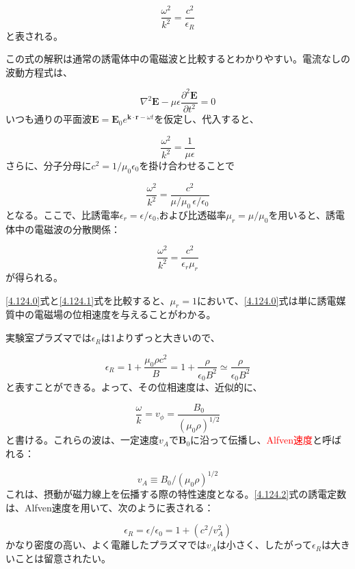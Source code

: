 \documentclass{ltjsarticle}
\numberwithin{equation}{section} %
\begin{document}
\begin{equation} \label{4.124.0}
  \frac{\omega^2}{k^2} = \frac{c^2}{\epsilon_R}
\end{equation}
と表される。

この式の解釈は通常の誘電体中の電磁波と比較するとわかりやすい。電流なしの波動方程式は、

\[
  \nabla^2\bm{E} -\mu\epsilon\frac{\partial^2 \bm{E}}{\partial t^2} = 0
\]
いつも通りの平面波$\bm{E}=\bm{E}_0e^{\bm{k}\cdot \bm{r} - \omega t}$を仮定し、代入すると、

\[
  \frac{\omega^2}{k^2} = \frac{1}{\mu \epsilon}
\]
さらに、分子分母に$c^2 = 1/\mu_0\epsilon_0$を掛け合わせることで

\[
  \frac{\omega^2}{k^2} = \frac{c^2}{\mu/\mu_0\,\epsilon/\epsilon_0}
\]
となる。ここで、比誘電率$\epsilon_r = \epsilon/\epsilon_0$,および比透磁率$\mu_r = \mu/\mu_0$を用いると、誘電体中の電磁波の分散関係：

\begin{equation}
  \frac{\omega^2}{k^2} = \frac{c^2}{\epsilon_r \mu_r} \label{4.124.1}
\end{equation}
が得られる。

\eqref{4.124.0}式と\eqref{4.124.1}式を比較すると、$\mu_r=1$において、\eqref{4.124.0}式は単に誘電媒質中の電磁場の位相速度を与えることがわかる。

実験室プラズマでは$\epsilon_R$は1よりずっと大きいので、

\begin{equation}
  \epsilon_R = 1 + \frac{\mu_0 \rho c^2}{B} = 1 + \frac{\rho}{\epsilon_0B^2} \simeq \frac{\rho}{\epsilon_0B^2} \label{4.124.2}
\end{equation}
と表すことができる。よって、その位相速度は、近似的に、

\begin{equation}
  \frac{\omega}{k} = v_\phi = \frac{B_0}{(\mu_0\rho)^{1/2}} \label{4.125}
\end{equation}
と書ける。これらの波は、一定速度$v_A$で$\bm{B}_0$に沿って伝播し、\textcolor{red}{Alfven速度}と呼ばれる：

\begin{equation}
  \boxed{v_A \equiv B_0/(\mu_0\rho)^{1/2}} \label{4.126}
\end{equation}
これは、摂動が磁力線上を伝播する際の特性速度となる。\eqref{4.124.2}式の誘電定数は、Alfven速度を用いて、次のように表される：

\begin{equation}
  \epsilon_R = \epsilon/\epsilon_0 = 1 + (c^2/v^2_A)
\end{equation}
かなり密度の高い、よく電離したプラズマでは$v_A$は小さく、したがって$\epsilon_R$は大きいことは留意されたい。
\end{document}
